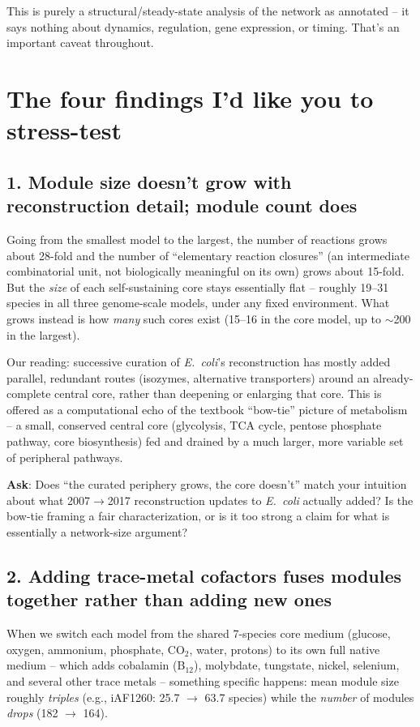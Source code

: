 \documentclass[11pt]{article}
\begin{document}
This is purely a structural/steady-state analysis of the network as annotated -- it says nothing about dynamics, regulation, gene expression, or timing. That's an important caveat throughout.

\section*{The four findings I'd like you to stress-test}

\subsection*{1. Module size doesn't grow with reconstruction detail; module count does}
Going from the smallest model to the largest, the number of reactions grows about 28-fold and the number of ``elementary reaction closures'' (an intermediate combinatorial unit, not biologically meaningful on its own) grows about 15-fold. But the \emph{size} of each self-sustaining core stays essentially flat -- roughly 19--31 species in all three genome-scale models, under any fixed environment. What grows instead is how \emph{many} such cores exist (15--16 in the core model, up to $\sim$200 in the largest).

Our reading: successive curation of \textit{E.\ coli}'s reconstruction has mostly added parallel, redundant routes (isozymes, alternative transporters) around an already-complete central core, rather than deepening or enlarging that core. This is offered as a computational echo of the textbook ``bow-tie'' picture of metabolism -- a small, conserved central core (glycolysis, TCA cycle, pentose phosphate pathway, core biosynthesis) fed and drained by a much larger, more variable set of peripheral pathways.

\textbf{Ask}: Does ``the curated periphery grows, the core doesn't'' match your intuition about what 2007$\to$2017 reconstruction updates to \textit{E.\ coli} actually added? Is the bow-tie framing a fair characterization, or is it too strong a claim for what is essentially a network-size argument?

\subsection*{2. Adding trace-metal cofactors fuses modules together rather than adding new ones}
When we switch each model from the shared 7-species core medium (glucose, oxygen, ammonium, phosphate, CO$_2$, water, protons) to its own full native medium -- which adds cobalamin (B$_{12}$), molybdate, tungstate, nickel, selenium, and several other trace metals -- something specific happens: mean module size roughly \emph{triples} (e.g., iAF1260: 25.7 $\to$ 63.7 species) while the \emph{number} of modules \emph{drops} (182 $\to$ 164).
\end{document}
